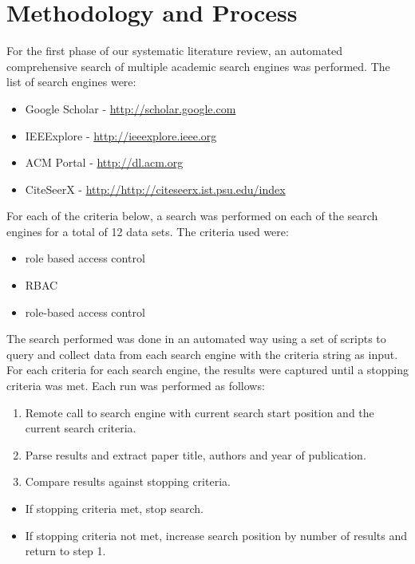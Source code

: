 \section{Methodology and Process} \label{sec:process}

For the first phase of our systematic literature review, an automated comprehensive search of multiple academic search engines was performed. The list of search engines were:
\begin{itemize}
\item {} 
Google Scholar - \href{http://scholar.google.com}{http://scholar.google.com}
\item {} 
IEEExplore     - \href{http://ieeexplore.ieee.org}{http://ieeexplore.ieee.org}
\item {} 
ACM Portal     - \href{http://dl.acm.org}{http://dl.acm.org}
\item {} 
CiteSeerX      - \href{http://http://citeseerx.ist.psu.edu/index}{http://http://citeseerx.ist.psu.edu/index}
\end{itemize}

For each of the criteria below, a search was performed on each of the search engines for a total of 12 data sets.  The criteria used were:
\begin{itemize}
\item {} 
role based access control
\item {} 
RBAC
\item {} 
role-based access control
\end{itemize}

The search performed was done in an automated way using a set of scripts to query and collect data from each search engine with the criteria string as input.  For each criteria for each search engine, the results were captured until a stopping criteria was met.  Each run was performed as follows:
\begin{enumerate}
\item {} 
Remote call to search engine with current search start position and the current search criteria.
\item {} 
Parse results and extract paper title, authors and year of publication.
\item {} 
Compare results against stopping criteria.
\end{enumerate}

\begin{itemize}
\item {} 
If stopping criteria met, stop search.
\item {} 
If stopping criteria not met, increase search position by number of results and return to step 1.
\end{itemize}

